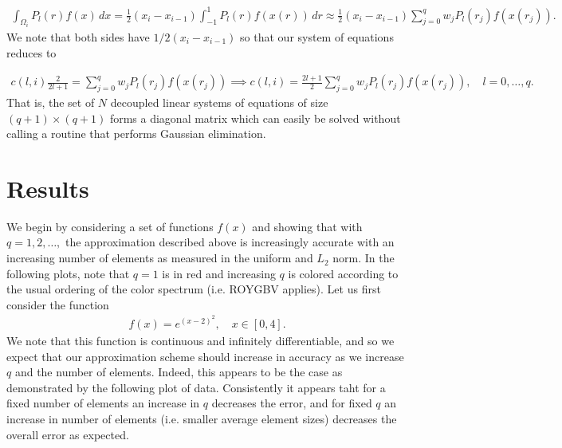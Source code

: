 \documentclass{article}
\begin{document}
  \begin{align*}
    \int_{\Omega_i} P_l(r) f(x) \, dx = \frac{1}{2} \left( x_i - x_{i-1}\right) \int_{-1}^1 P_l(r) f(x(r)) \, dr \approx \frac{1}{2} \left( x_i - x_{i-1}\right)\sum_{j=0}^q w_j P_l(r_j) f(x(r_j)).
  \end{align*}
We note that both sides have $1/2 \left( x_i - x_{i-1}\right)$ so that our system of equations reduces to 

  \begin{align*}
    c(l,i) \frac{2}{2l + 1} = \sum_{j=0}^q w_j P_l(r_j) f(x(r_j)) \implies c(l,i) = \frac{2l + 1}{2} \sum_{j=0}^q w_j P_l(r_j) f(x(r_j)), \quad l = 0,\dots, q .
  \end{align*}
That is, the set of $N$ decoupled linear systems of equations of size $(q+1)\times(q+1)$ forms a diagonal matrix which can easily be solved without calling a routine that performs Gaussian elimination.

\section{Results}
We begin by considering a set of functions $f(x)$ and showing that with $q=1,2,\dots,$ the approximation described above is increasingly accurate with an increasing number of elements as measured in the uniform and $L_2$ norm. In the following plots, note that $q = 1$ is in red and increasing $q$ is colored according to the usual ordering of the color spectrum (i.e. ROYGBV applies). Let us first consider the function
  \begin{align*}
    f(x) = e^{\left( x - 2\right)^2}, \quad x\in \left[ 0,4\right].
  \end{align*}
We note that this function is continuous and infinitely differentiable, and so we expect that our approximation scheme should increase in accuracy as we increase $q$ and the number of elements. Indeed, this appears to be the case as demonstrated by the following plot of data. Consistently it appears taht for a fixed number of elements an increase in $q$ decreases the error, and for fixed $q$ an increase in number of elements (i.e. smaller average element sizes) decreases the overall error as expected.
\end{document}
